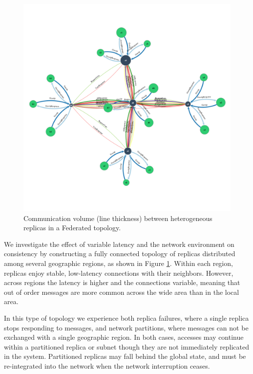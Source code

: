 \documentclass[10pt,conference,letterpaper]{IEEEtran}
\begin{document}
\begin{figure}
    \centering
      \includegraphics[width=\linewidth]{figures/federated_sync}
    \caption{Communication volume (line thickness) between  heterogeneous replicas in a Federated topology.}
    \label{fig:topology}
\end{figure}

We investigate the effect of variable latency and the network environment on consistency by
constructing a fully connected topology of replicas distributed among several
geographic regions, as shown in Figure \ref{fig:topology}.
Within each region, replicas enjoy stable, low-latency connections with their
neighbors.
However, across regions the latency is higher and the connections variable, meaning that
out of order messages are more common across the wide area than in the local area.

In this type of topology we experience both
replica failures, where a single replica stops responding to
messages, and network partitions, where messages can not be exchanged
with a single geographic region.
In both cases, accesses may continue within a partitioned replica or subnet
though they are not immediately replicated in the system.
Partitioned replicas may fall behind the global state, and must be
re-integrated into the network when the network interruption ceases.
\end{document}
